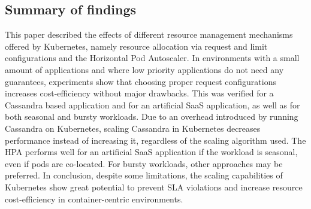 \subsection{Summary of findings}
This paper described the effects of different resource management mechanisms offered by Kubernetes, namely resource allocation via request and limit configurations and the Horizontal Pod Autoscaler. In environments with a small amount of applications and where low priority applications do not need any guarantees, experiments show that choosing proper request configurations increases cost-efficiency without major drawbacks. This was verified for a Cassandra based application and for an artificial SaaS application, as well as for both seasonal and bursty workloads. Due to an overhead introduced by running Cassandra on Kubernetes, scaling Cassandra in Kubernetes decreases performance instead of increasing it, regardless of the scaling algorithm used. The HPA performs well for an artificial SaaS application if the workload is seasonal, even if pods are co-located. For bursty workloads, other approaches may be preferred. In conclusion, despite some limitations, the scaling capabilities of Kubernetes show great potential to prevent SLA violations and increase resource cost-efficiency in container-centric environments.




